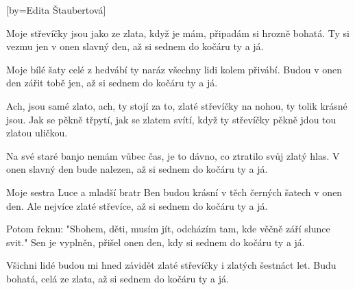 [by={Edita Štaubertová}]

\beginverse{}
Moje střevíčky jsou jako ze zlata,
když je mám, připadám si hrozně bohatá.
Ty si vezmu jen v onen slavný den,
až si sednem do kočáru ty a já.
\endverse{}

\beginverse{}
Moje bílé šaty celé z hedvábí
ty naráz všechny lidi kolem přivábí.
Budou v onen den zářit tobě jen,
až si sednem do kočáru ty a já.
\endverse{}

\beginchorus{}
Ach, jsou samé zlato, ach, ty stojí za to,
zlaté střevíčky na nohou, ty tolik krásné jsou.
Jak se pěkně třpytí, jak se zlatem svítí,
když ty střevíčky pěkně jdou
tou zlatou uličkou.   
\endchorus{}

\beginverse{}
Na své staré banjo nemám vůbec čas,
je to dávno, co ztratilo svůj zlatý hlas.
V onen slavný den bude nalezen,
až si sednem do kočáru ty a já.
\endverse{}

\beginverse{}
Moje sestra Luce a mladší bratr Ben
budou krásní v těch černých šatech v onen den.
Ale nejvíce zlaté střevíce,
až si sednem do kočáru ty a já.
\endverse{}

\beginchorus{}

\endchorus{}

\beginverse{}
Potom řeknu: "Sbohem, děti, musím jít,
odcházím tam, kde věčně září slunce svit."
Sen je vyplněn, přišel onen den,
kdy si sednem do kočáru ty a já.
\endverse{}

\beginverse{}
Všichni lidé budou mi hned závidět
zlaté střevíčky i zlatých šestnáct let.
Budu bohatá, celá ze zlata,
až si sednem do kočáru ty a já.
\endverse{}

\beginchorus{}

\endchorus{}

\endsong{}
